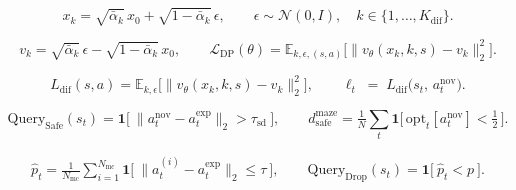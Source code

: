 \begin{equation}
x_k=\sqrt{\bar\alpha_k}\,x_0+\sqrt{1-\bar\alpha_k}\,\epsilon,
\qquad \epsilon\sim\mathcal{N}(0,I),\quad k\in\{1,\dots,K_{\mathrm{dif}}\}.
\label{eq:forward}
\end{equation}

\begin{equation}
v_k=\sqrt{\bar\alpha_k}\,\epsilon-\sqrt{1-\bar\alpha_k}\,x_0,
\qquad
\mathcal{L}_{\mathrm{DP}}(\theta)=\mathbb{E}_{k,\epsilon,(s,a)}\big[\big\|v_\theta(x_k,k,s)-v_k\big\|_2^2\big].
\label{eq:vpred}
\end{equation}

\begin{equation}
L_{\mathrm{dif}}(s,a)=\mathbb{E}_{k,\epsilon}\big[\big\|v_\theta(x_k,k,s)-v_k\big\|_2^2\big],
\qquad
\ell_t \;=\; L_{\mathrm{dif}}\big(s_t,\,a^{\mathrm{nov}}_t\big).
\label{eq:diffsignal}
\end{equation}



\begin{equation}
\mathrm{Query}_{\mathrm{Safe}}(s_t)=\mathbf{1}\big[\ \|a^{\mathrm{nov}}_t-a^{\mathrm{exp}}_t\|_2 > \tau_{\mathrm{sd}}\ \big],
\qquad
d^{\mathrm{maze}}_{\mathrm{safe}}=\tfrac1N\!\sum_{t}\mathbf{1}\!\big[\,\mathrm{opt}_t[a^{\mathrm{nov}}_t]<\tfrac12\,\big].
\label{eq:safe}
\end{equation}

\begin{align}
\hat p_t=\tfrac{1}{N_{\mathrm{mc}}}\sum_{i=1}^{N_{\mathrm{mc}}}\mathbf{1}\big[\ \|a^{(i)}_t-a^{\mathrm{exp}}_t\|_2\le\tau\ \big],
\qquad
\mathrm{Query}_{\mathrm{Drop}}(s_t)=\mathbf{1}\big[\ \hat p_t<p\ \big].
\label{eq:dropout}
\end{align}

